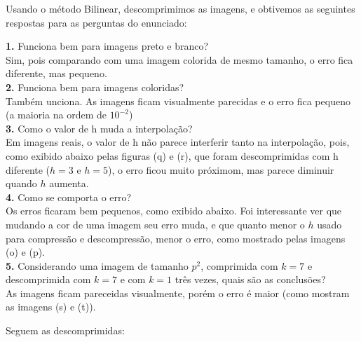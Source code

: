 \documentclass[12pt,letterpaper]{article}
\begin{document}
	Usando o método Bilinear, descomprimimos as imagens, e obtivemos as seguintes respostas para as perguntas do enunciado:
	
	\textbf{1.} Funciona bem para imagens preto e branco?\\
	Sim, pois comparando com uma imagem colorida de mesmo tamanho, o erro fica diferente, mas pequeno.\\
	
	\textbf{2.} Funciona bem para imagens coloridas?\\
	Também unciona. As imagens ficam visualmente parecidas e o erro fica pequeno (a maioria na ordem de $10^{-2}$)\\
	
	\textbf{3.} Como o valor de h muda a interpolação? \\
	Em imagens reais, o valor de h não parece interferir tanto na interpolação, pois, como exibido abaixo pelas figuras (q) e (r), que foram descomprimidas com h diferente ($h = 3$ e $h = 5$), o erro ficou muito próximom, mas parece diminuir quando $h$ aumenta.\\
	
	\textbf{4.} Como se comporta o erro?\\
	Os erros ficaram bem pequenos, como exibido abaixo. Foi interessante ver que mudando a cor de uma imagem seu erro muda, e que quanto menor o $h$ usado para compressão e descompressão, menor o erro, como mostrado pelas imagens (o) e (p). \\
	
	\textbf{5.} Considerando uma imagem de tamanho $p^2$, comprimida com $k = 7$ e descomprimida com $k = 7$ e com $k = 1$ três vezes, quais são as conclusões?\\
	As imagens ficam pareceidas visualmente, porém o erro é maior (como mostram as imagens (s) e (t)).
	
	Seguem as descomprimidas:
	
	\begin{figure}[h]
	\end{figure}
	
	\begin{figure}[h]
	\end{figure}
	
\end{document}
